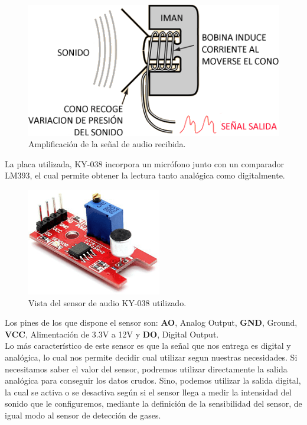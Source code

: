 \begin{figure}[H]
  \begin{center}
    \includegraphics[scale=0.6]{imagenes/micro_amplificador.png}
  \end{center}
  \caption{Amplificación de la señal de audio recibida.}
  \label{figura:micro_amplificacion}
\end{figure}

La placa utilizada, KY-038 incorpora un micrófono junto con un comparador LM393, el cual permite obtener la lectura tanto analógica como digitalmente.\\

\begin{figure}[H]
  \begin{center}
    \includegraphics[scale=0.6]{imagenes/micro.png}
  \end{center}
  \caption{Vista del sensor de audio KY-038 utilizado.}
  \label{figura:micro_amplificacion}
\end{figure}

Los pines de los que dispone el sensor son: \textbf{AO}, Analog Output, \textbf{GND}, Ground, \textbf{VCC}, Alimentación de 3.3V a 12V y \textbf{DO}, Digital Output.\\

Lo más característico de este sensor es que la señal que nos entrega es digital y analógica, lo cual nos permite decidir cual utilizar segun nuestras necesidades.
Si necesitamos saber el valor del sensor, podremos utilizar directamente la salida analógica para conseguir los datos crudos. Sino, podemos utilizar la salida digital, la cual
se activa o se desactiva según si el sensor llega a medir la intensidad del sonido que le configuremos, mediante la definición de la sensibilidad del sensor, de igual modo al sensor de detección de gases. \\

